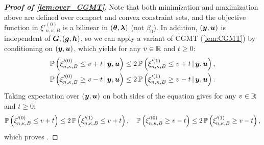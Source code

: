 \begin{proof}[\textbf{Proof of \cref{lem:over_CGMT}}]
Note that both minimization and maximization above are defined over compact and convex constraint sets, and the objective function in $\xi'^{(0)}_{n, \kappa, B}$ is a bilinear in $(\vtheta, \blambda)$ (not $\beta_0$). In addition, $(\yy, \uu)$ is independent of $\GG, (\vg, \hh)$, so we can apply a variant of CGMT (\cref{lem:CGMT}) by conditioning on $(\yy, \uu)$, which yields for any $v \in \R$ and $t \ge 0$:
\begin{align*}
    & \P\left( \xi'^{(0)}_{n, \kappa, B} \le v+t \,|\, \yy, \uu \right) \le 2\, \P\left( \xi'^{(1)}_{n, \kappa, B} \le v+t \,|\, \yy, \uu \right),
    \\
    & \P\left( \xi'^{(0)}_{n, \kappa, B} \ge v-t \,|\, \yy, \uu \right) \le 2\, \P\left( \xi'^{(1)}_{n, \kappa, B} \ge v-t \,|\, \yy, \uu \right).
\end{align*}
Taking expectation over $(\yy, \uu)$ on both sides of the equation gives for any $v \in \R$ and $t \ge 0$:
\begin{equation*}
    \P\left( \xi'^{(0)}_{n, \kappa, B} \le v+t \right) \le 2\, \P\left( \xi'^{(1)}_{n, \kappa, B} \le v+t \right),
    \quad
    \P\left( \xi'^{(0)}_{n, \kappa, B} \ge v-t \right) \le 2\, \P\left( \xi'^{(1)}_{n, \kappa, B} \ge v-t \right),
\end{equation*}
which proves .
\end{proof}










